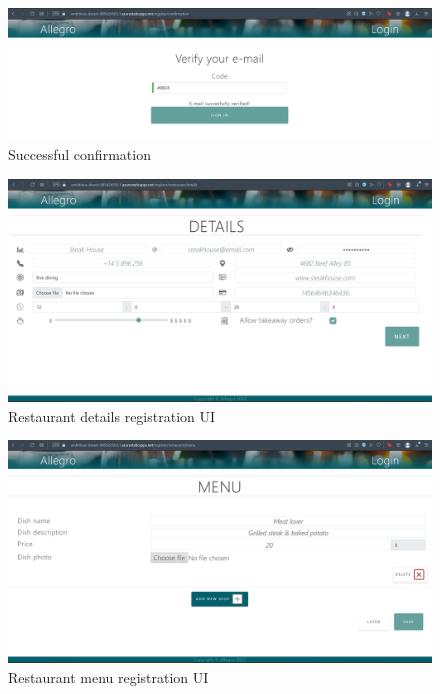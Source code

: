 \begin{figure}[ht]
	\centering
	\includegraphics[width=150mm, keepaspectratio]{figures/UI/8_ConfirmSuccess.png}
	\caption{Successful confirmation} 
	\label{fig:UI_8.3}
\end{figure}

\begin{figure}[ht]
	\centering
	\includegraphics[width=150mm, keepaspectratio]{figures/UI/9_RestaurantDetailsEdit.png}
	\caption{Restaurant details registration UI} 
	\label{fig:UI_9}
\end{figure}

\begin{figure}[ht]
	\centering
	\includegraphics[width=150mm, keepaspectratio]{figures/UI/10_RestaurantMenuEdit.png}
	\caption{Restaurant menu registration UI} 
	\label{fig:UI_10}
\end{figure}

